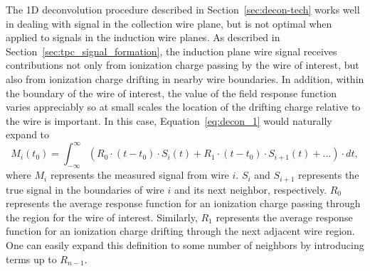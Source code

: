 The 1D deconvolution procedure described in Section~\ref{sec:decon-tech} %
works well in dealing with signal in the collection wire plane, but is not 
optimal when applied to signals in the induction wire planes. 
As described in Section~\ref{sec:tpc_signal_formation}, the induction plane wire 
signal receives contributions not only from ionization charge 
passing by the wire of interest, but also from ionization charge drifting in 
nearby wire boundaries. In addition, within the boundary of the wire of 
interest, the value of the field response function varies appreciably 
 so at small scales the location of the drifting charge relative to the wire 
is important. In this case, Equation~\ref{eq:decon_1} would naturally expand to 
\begin{equation}\label{eq:decon_2d_1}
M_i(t_0) = \int_{-\infty}^{\infty} \left( R_0 \cdot (t-t_0) \cdot S_i(t) + 
R_1 \cdot (t-t_0) \cdot S_{i+1} (t) + ...\right) \cdot dt,
\end{equation}
where $M_i$ represents the measured signal from wire $i$.  $S_i$ and
$S_{i+1}$ represents the true signal in the boundaries of wire $i$ and
its next neighbor, respectively.
$R_0$ represents the average response function for an ionization
charge passing through the region for the wire of interest.
Similarly, $R_1$ represents the average response function for an
ionization charge drifting through the next adjacent wire region. One can
easily expand this definition to some number of neighbors by introducing terms up 
to $R_{n-1}$.

